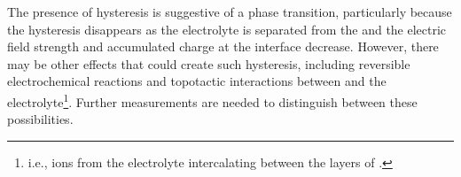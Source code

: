 The presence of hysteresis is suggestive of a phase transition, particularly because the hysteresis disappears as the electrolyte is separated from the \rucl and the electric field strength and accumulated charge at the interface decrease. However, there may be other effects that could create such hysteresis, including reversible electrochemical reactions and topotactic interactions between \rucl and the electrolyte\footnote{i.e., ions from the electrolyte intercalating between the layers of \ruclnospace .}. Further measurements are needed to distinguish between these possibilities.

